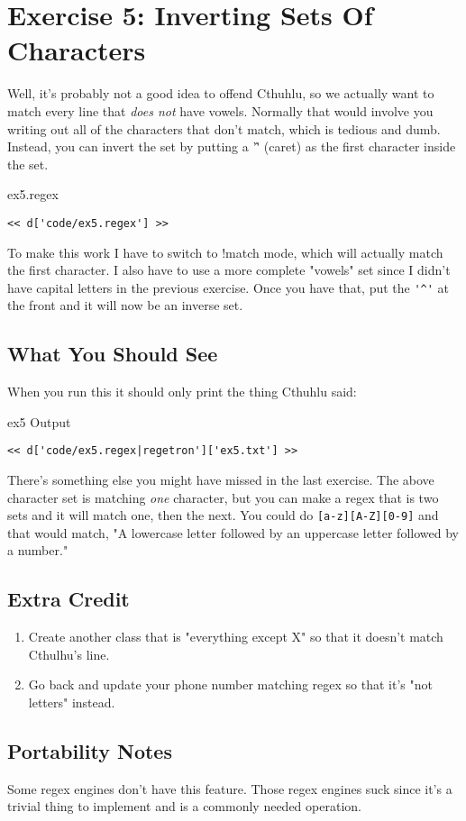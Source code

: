 \chapter{Exercise 5: Inverting Sets Of Characters}

Well, it's probably not a good idea to offend Cthuhlu, so we actually want
to match every line that \emph{does not} have vowels.  Normally that would
involve you writing out all of the characters that don't match, which is
tedious and dumb.  Instead, you can invert the set by putting a '\^' (caret)
as the first character inside the set.

\begin{code}{ex5.regex}
\begin{Verbatim}
<< d['code/ex5.regex'] >>
\end{Verbatim}
\end{code}

To make this work I have to switch to !match mode, which will actually
match the first character.  I also have to use a more complete "vowels"
set since I didn't have capital letters in the previous exercise.  Once
you have that, put the \verb|'^'| at the front and it will now be an inverse
set.

\section{What You Should See}

When you run this it should only print the thing Cthuhlu said:

\begin{code}{ex5 Output}
\begin{Verbatim}
<< d['code/ex5.regex|regetron']['ex5.txt'] >>
\end{Verbatim}
\end{code}

There's something else you might have missed in the last exercise.
The above character set is matching \emph{one} character, but you can
make a regex that is two sets and it will match one, then the next.
You could do \verb|[a-z][A-Z][0-9]| and that would match, "A lowercase
letter followed by an uppercase letter followed by a number."

\section{Extra Credit}

\begin{enumerate}
\item Create another class that is "everything except X" so that it
    doesn't match Cthulhu's line.
\item Go back and update your phone number matching regex so that it's
    "not letters" instead.
\end{enumerate}

\section{Portability Notes}

Some regex engines don't have this feature. Those regex engines suck
since it's a trivial thing to implement and is a commonly needed operation.

